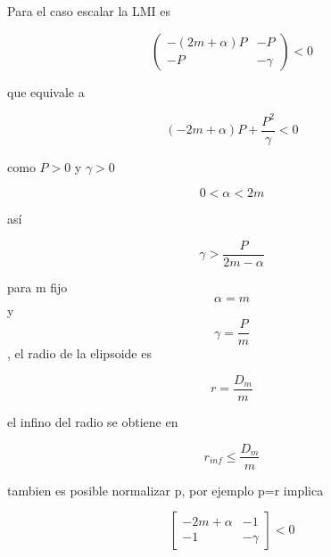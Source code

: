  Para el caso escalar la LMI es

 \begin{equation*}
    \begin{pmatrix}
        -(2m+\alpha)P & -P \\ -P & -\gamma
    \end{pmatrix} < 0
 \end{equation*}

 que equivale a 

 \begin{equation*}
    (-2m+\alpha)P+ \frac{P^2}{\gamma} <0
 \end{equation*}

como \(P>0\) y \(\gamma>0\)

 \begin{equation*}
    0<\alpha<2m
 \end{equation*}

 así 

 \begin{equation*}
    \gamma > \frac{P}{2m-\alpha}
 \end{equation*}

 para m fijo \begin{equation*}
    \alpha=m
 \end{equation*} y \begin{equation*}
    \gamma=\frac{P}{m}
 \end{equation*} , el radio  de la elipsoide es

 \begin{equation*}
    r=\frac{D_m}{m}
 \end{equation*}










 el infino del radio se obtiene en 

 \begin{equation*}
    r_{inf} \leq \frac{D_m}{m}
 \end{equation*}

 tambien es posible normalizar p, por ejemplo p=r implica

 \begin{equation*}
    \begin{bmatrix}
        -2m+\alpha & -1 \\
        -1 & -\gamma
    \end{bmatrix} < 0
 \end{equation*}

